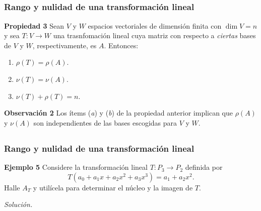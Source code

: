 
\subsection{}

\begin{frame}\frametitle{Rango y nulidad de una transformación lineal}
	\vspace{-3mm}
	\begin{prop}{\textbf{Propiedad 3}}
		\justifying
		Sean $V$ y $W$ espacios vectoriales de dimensión finita con $\dim V=n$ y sea $T: V\longrightarrow W$ una trasnfomación lineal cuya matriz con respecto a \textit{ciertas} bases de $V$ y $W$, respectivamente, es $A$. Entonces:
		\begin{enumerate}[1.]
			\justifying
			\item[\labelname{$a$}] $\rho(T)=\rho(A)$.
			\item[\labelname{$b$}] $\nu(T)=\nu(A)$.
			\item[\labelname{$c$}] $\nu(T)+\rho(T)=n$.
		\end{enumerate}
	\end{prop}
	\begin{alertblock}{\textbf{Observación 2}}
		\justifying
		Los ítems (\textit{a}) y (\textit{b}) de la propiedad anterior implican que $\rho(A)$ y $\nu(A)$ son independientes de las bases escogidas para $V$ y $W$.
	\end{alertblock}

\end{frame}


\subsection{}

\begin{frame}\frametitle{Rango y nulidad de una transformación lineal}

\begin{ej}{\textbf{Ejemplo 5}}
	\justifying
	Considere la transformación lineal $T: P_3\longrightarrow P_2$ definida por 
	\[
		T\left(a_0+a_1x+a_2x^2+a_3x^3\right)=a_1+a_2x^2.
	\]
	Halle $A_T$ y utilícela para determinar el núcleo y la imagen de $T$.
\end{ej}
\textit{Solución.}

\end{frame}

